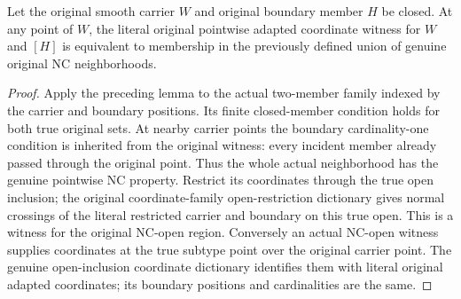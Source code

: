 \begin{lemma}
\label{hir:sharp-pointwise-normal-crossings-original-open-recognition}
\leanok
Let the original smooth carrier $W$ and original boundary member $H$ be
closed. At any point of $W$, the literal original pointwise adapted
coordinate witness for $W$ and $[H]$ is equivalent to membership in the
previously defined union of genuine original NC neighborhoods.
\end{lemma}
\begin{proof}
Apply the preceding lemma to the actual two-member family indexed by
the carrier and boundary positions. Its finite closed-member condition
holds for both true original sets. At nearby carrier points the boundary
cardinality-one condition is inherited from the original witness: every
incident member already passed through the original point. Thus the
whole actual neighborhood has the genuine pointwise NC property.
Restrict its coordinates through the true open inclusion; the original
coordinate-family open-restriction dictionary gives normal crossings
of the literal restricted carrier and boundary on this true open.
This is a witness for the original NC-open region. Conversely an actual
NC-open witness supplies coordinates at the true subtype point over
the original carrier point. The genuine open-inclusion coordinate
dictionary identifies them with literal original adapted coordinates;
its boundary positions and cardinalities are the same.
\end{proof}

